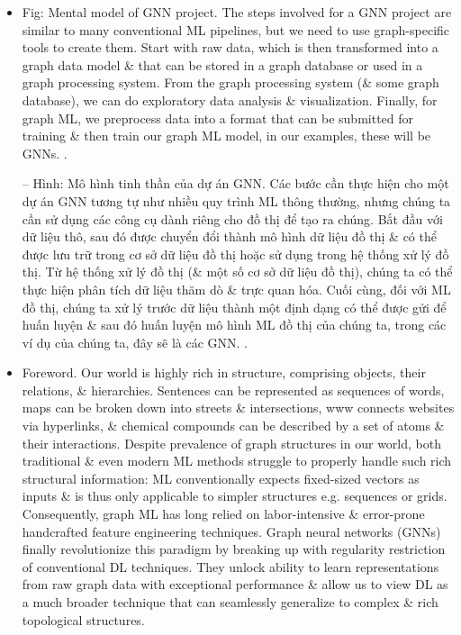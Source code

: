 \documentclass{article}
\begin{document}
\begin{itemize}
    \item {\sf Fig: Mental model of GNN project.}  The steps involved for a GNN project are similar to many conventional ML pipelines, but we need to use graph-specific tools to create them. Start with raw data, which is then transformed into a graph data model \& that can be stored in a graph database or used in a graph processing system. From the graph processing system (\& some graph database), we can do exploratory data analysis \& visualization. Finally, for graph ML, we preprocess data into a format that can be submitted for training \& then train our graph ML model, in our examples, these will be GNNs. .

    -- {\sf Hình: Mô hình tinh thần của dự án GNN.} Các bước cần thực hiện cho một dự án GNN tương tự như nhiều quy trình ML thông thường, nhưng chúng ta cần sử dụng các công cụ dành riêng cho đồ thị để tạo ra chúng. Bắt đầu với dữ liệu thô, sau đó được chuyển đổi thành mô hình dữ liệu đồ thị \& có thể được lưu trữ trong cơ sở dữ liệu đồ thị hoặc sử dụng trong hệ thống xử lý đồ thị. Từ hệ thống xử lý đồ thị (\& một số cơ sở dữ liệu đồ thị), chúng ta có thể thực hiện phân tích dữ liệu thăm dò \& trực quan hóa. Cuối cùng, đối với ML đồ thị, chúng ta xử lý trước dữ liệu thành một định dạng có thể được gửi để huấn luyện \& sau đó huấn luyện mô hình ML đồ thị của chúng ta, trong các ví dụ của chúng ta, đây sẽ là các GNN. .
    \item {\sf Foreword.} Our world is highly rich in structure, comprising objects, their relations, \& hierarchies. Sentences can be represented as sequences of words, maps can be broken down into streets \& intersections, www connects websites via hyperlinks, \& chemical compounds can be described by a set of atoms \& their interactions. Despite prevalence of graph structures in our world, both traditional \& even modern ML methods struggle to properly handle such rich structural information: ML conventionally expects fixed-sized vectors as inputs \& is thus only applicable to simpler structures e.g. sequences or grids. Consequently, graph ML has long relied on labor-intensive \& error-prone handcrafted feature engineering techniques. Graph neural networks (GNNs) finally revolutionize this paradigm by breaking up with regularity restriction of conventional DL techniques. They unlock ability to learn representations from raw graph data with exceptional performance \& allow us to view DL as a much broader technique that can seamlessly generalize to complex \& rich topological structures.


\end{itemize}
\end{document}
